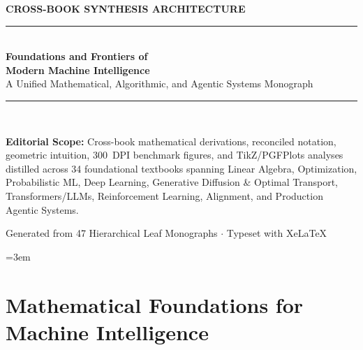 \documentclass[11pt,a4paper,oneside]{report}
\begin{document}
\begin{titlepage}
  \centering
  \vspace*{2.0cm}
  {\small\textsf{\color{monographTeal}\textbf{CROSS-BOOK SYNTHESIS ARCHITECTURE}}}\\[0.8em]
  \textcolor{monographNavy}{\rule{0.85\textwidth}{2pt}}\\[1.5em]
  {\Huge\bfseries\color{monographNavy} Foundations and Frontiers of\\Modern Machine Intelligence}\\[1.2em]
  {\Large\color{monographSlate} A Unified Mathematical, Algorithmic, and Agentic Systems Monograph}\\[1.5em]
  \textcolor{monographRule}{\rule{0.65\textwidth}{1pt}}\\[2.2em]
  \begin{tcolorbox}[
    enhanced, colback=monographNavyBg, colframe=monographNavy,
    boxrule=0.8pt, leftrule=3.5pt, width=0.88\textwidth, arc=3pt
  ]
    \small\color{monographSlate}
    \textbf{Editorial Scope:} Cross-book mathematical derivations, reconciled notation,
    geometric intuition, 300~DPI benchmark figures, and TikZ/PGFPlots analyses distilled
    across 34 foundational textbooks spanning Linear Algebra, Optimization, Probabilistic ML,
    Deep Learning, Generative Diffusion \& Optimal Transport, Transformers/LLMs,
    Reinforcement Learning, Alignment, and Production Agentic Systems.
  \end{tcolorbox}
  \vfill
  {\footnotesize\textsf{\color{monographSlate} Generated from 47 Hierarchical Leaf Monographs $\cdot$ Typeset with XeLaTeX}}
\end{titlepage}

\setcounter{tocdepth}{1}
{\sloppy\emergencystretch=3em\tableofcontents}
\cleardoublepage
{}

\part{Mathematical Foundations for Machine Intelligence}
\end{document}
